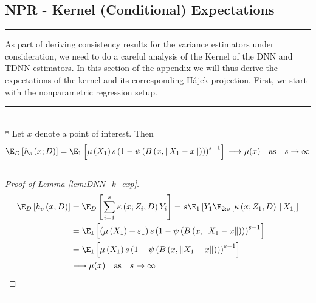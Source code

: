 \newpage
\subsection{NPR - Kernel (Conditional) Expectations}\label{subsec:KernelCondExp}
\hrule
As part of deriving consistency results for the variance estimators under consideration, we need to do a careful analysis of the Kernel of the DNN and TDNN estimators.
In this section of the appendix we will thus derive the expectations of the kernel and its corresponding H\'ajek projection.
First, we start with the nonparametric regression setup.
\vspace{0.5cm}
\hrule

\begin{lem}\label{lem:DNN_k_exp}\mbox{}\\*
	Let $x$ denote a point of interest.
	Then
	\begin{equation}
		\E_D\left[h_s\left(x; D\right)\right]
		= \E_{1}\left[\mu\left(X_1\right) s\left(1 - \psi\left(B\left(x, \|X_1 - x\|\right)\right)\right)^{s-1}\right]\\
		\longrightarrow \mu(x) \quad \text{as} \quad s \rightarrow \infty
	\end{equation}
\end{lem}
\hrule
\begin{proof}[Proof of Lemma \ref{lem:DNN_k_exp}]
	\begin{equation}
		\begin{aligned}
			\E_D\left[h_s\left(x; D\right)\right]
			 & = \E_D\left[\sum_{i = 1}^{s} \kappa\left(x; Z_{i}, D\right) Y_{i}\right]
			= s \E_{1}\left[Y_1 \E_{2:s}\left[\kappa\left(x; Z_1, D\right)\, | \, X_1 \right]\right]                                                                \\
			 & = \E_{1}\left[\left(\mu\left(X_1\right) + \varepsilon_1\right) s\left(1 - \psi\left(B\left(x, \|X_1 - x\|\right)\right)\right)^{s-1}\right] \\
			 & = \E_{1}\left[\mu\left(X_1\right) s\left(1 - \psi\left(B\left(x, \|X_1 - x\|\right)\right)\right)^{s-1}\right]                              \\
			 & \longrightarrow \mu(x) \quad \text{as} \quad s \rightarrow \infty
		\end{aligned}
	\end{equation}
\end{proof}

\hrule

